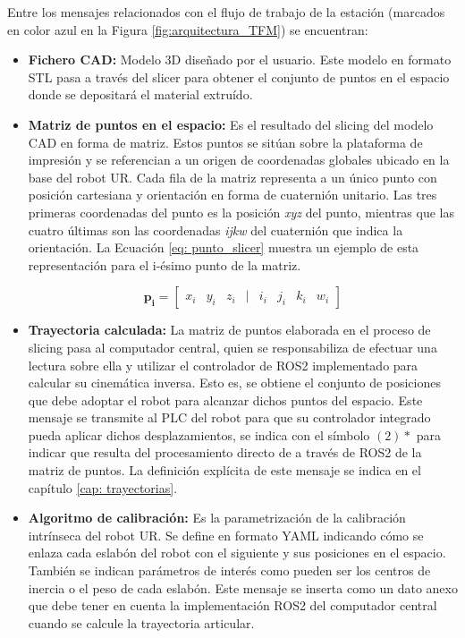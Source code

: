 Entre los mensajes relacionados con el flujo de trabajo de la estación (marcados en color azul en la Figura \ref{fig:arquitectura_TFM}) se encuentran:
\begin{itemize}
    \item \textbf{Fichero \acrshort{CAD}:} Modelo 3D diseñado por el usuario. Este modelo en formato \acrshort{STL} pasa a través del slicer para obtener el conjunto de puntos en el espacio donde se depositará el material extruído. 
    \item \textbf{Matriz de puntos en el espacio:} Es el resultado del slicing del modelo \acrshort{CAD} en forma de matriz. Estos puntos se sitúan sobre la plataforma de impresión y se referencian a un origen de coordenadas globales ubicado en la base del robot UR. Cada fila de la matriz representa a un único punto con posición cartesiana y orientación en forma de cuaternión unitario. Las tres primeras coordenadas del punto es la posición \textit{xyz} del punto, mientras que las cuatro últimas son las coordenadas \textit{ijkw} del cuaternión que indica la orientación. La Ecuación \ref{eq: punto_slicer} muestra un ejemplo de esta representación para el i-ésimo punto de la matriz.

    \begin{equation}
        \boldsymbol{p_i}= \begin{bmatrix}
            x_i & y_i & z_i & | & i_i& j_i& k_i& w_i 
        \end{bmatrix}
        \label{eq: punto_slicer}
    \end{equation}

    \item \textbf{Trayectoria  calculada:} La matriz de puntos elaborada en el proceso de slicing pasa al computador central, quien se responsabiliza de efectuar una lectura sobre ella y utilizar el controlador de ROS2 implementado para calcular su cinemática inversa. Esto es, se obtiene el conjunto de posiciones que debe adoptar el robot para alcanzar dichos puntos del espacio. Este mensaje se transmite al \acrshort{PLC} del robot para que su controlador integrado pueda aplicar dichos desplazamientos, se indica con el símbolo $(2)*$ para indicar que resulta del procesamiento directo de a través de ROS2 de la matriz de puntos. La definición explícita de este mensaje se indica en el capítulo \ref{cap: trayectorias}.

    \item \textbf{Algoritmo de calibración:} Es la parametrización de la calibración intrínseca del robot UR. Se define en formato \acrshort{YAML} indicando cómo se enlaza cada eslabón del robot con el siguiente y sus posiciones en el espacio. También se indican parámetros de interés como pueden ser los centros de inercia o el peso de cada eslabón. Este mensaje se inserta como un dato anexo que debe tener en cuenta la implementación ROS2 del computador central cuando se calcule la trayectoria articular.


\end{itemize}
